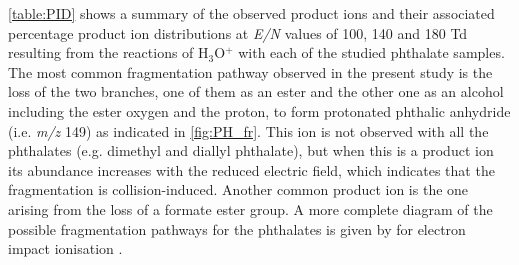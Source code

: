  \autoref{table:PID} shows a summary of the observed product ions and their associated percentage product ion distributions at \textit{E/N} values of 100, 140 and 180 Td resulting from the reactions of H$_3$O$^+$ with each of the studied phthalate samples. 
%
The most common fragmentation pathway observed in the present study is the loss of the two %
branches, one of them as an ester and the other one as an alcohol including the ester oxygen and the proton, to form protonated phthalic anhydride (i.e. \textit{m/z} 149) as indicated in \autoref{fig:PH_fr}.
%
This ion is not observed with all the phthalates (e.g. dimethyl and diallyl phthalate), but when this is a product ion its abundance increases with the reduced electric field, which indicates that the fragmentation is collision-induced.
%
Another common product ion is the one arising from the loss of a formate ester group.
%
A more complete diagram of the possible fragmentation pathways for the phthalates is  given by \citeauthor{yin2014mass} for electron impact ionisation \cite{yin2014mass}.

